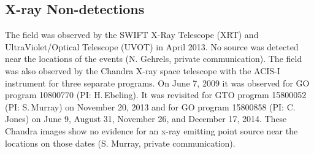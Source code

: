 \subsection{X-ray Non-detections}\label{sec:Xray}

The  field was observed by the SWIFT X-Ray Telescope (XRT) and
UltraViolet/Optical Telescope (UVOT) in April 2013.  No source was
detected near the locations of the \spock events (N. Gehrels, private
communication).  The field was also observed by the Chandra X-ray
space telescope with the ACIS-I instrument for three separate
programs.  On June 7, 2009 it was observed for GO program 10800770
(PI: H.\,Ebeling).  It was revisited for GTO program 15800052 (PI:
S.\,Murray) on November 20, 2013 and for GO program 15800858 (PI: C.\,
Jones) on June 9, August 31, November 26, and December 17, 2014. These
Chandra images show no evidence for an x-ray emitting point source
near the \spock locations on those dates (S. Murray, private
communication). 
